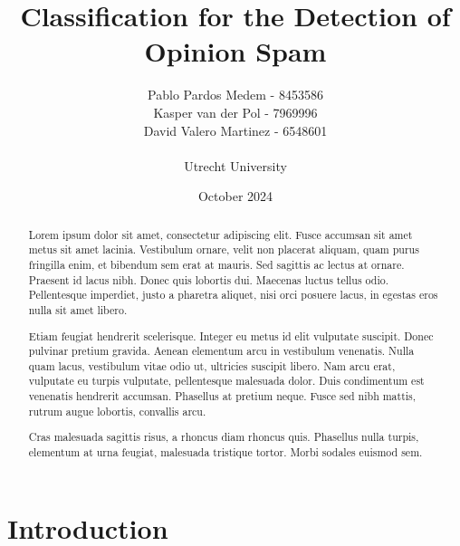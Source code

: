 \documentclass[a4paper,11pt]{article}
\title{\vspace{-1cm}Classification for the Detection of Opinion Spam}
\author{Pablo Pardos Medem - 8453586\\ Kasper van der Pol - 7969996\\ David Valero Martinez - 6548601\\\\
Utrecht University}
\date{October 2024}
\begin{document}
\maketitle



\begin{abstract}

Lorem ipsum dolor sit amet, consectetur adipiscing elit. Fusce accumsan sit amet metus sit amet lacinia. Vestibulum ornare, velit non placerat aliquam, quam purus fringilla enim, et bibendum sem erat at mauris. Sed sagittis ac lectus at ornare. Praesent id lacus nibh. Donec quis lobortis dui. Maecenas luctus tellus odio. Pellentesque imperdiet, justo a pharetra aliquet, nisi orci posuere lacus, in egestas eros nulla sit amet libero.

Etiam feugiat hendrerit scelerisque. Integer eu metus id elit vulputate suscipit. Donec pulvinar pretium gravida. Aenean elementum arcu in vestibulum venenatis. Nulla quam lacus, vestibulum vitae odio ut, ultricies suscipit libero. Nam arcu erat, vulputate eu turpis vulputate, pellentesque malesuada dolor. Duis condimentum est venenatis hendrerit accumsan. Phasellus at pretium neque. Fusce sed nibh mattis, rutrum augue lobortis, convallis arcu.

Cras malesuada sagittis risus, a rhoncus diam rhoncus quis. Phasellus nulla turpis, elementum at urna feugiat, malesuada tristique tortor. Morbi sodales euismod sem.

\end{abstract}

\newpage

\section{Introduction}
\end{document}
